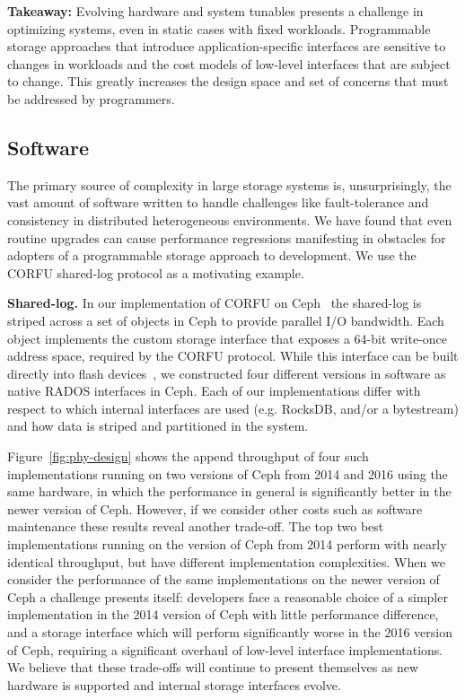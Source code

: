 \textbf{Takeaway:} Evolving hardware and system tunables presents a challenge
in optimizing systems, even in static cases with fixed workloads. Programmable
storage approaches that introduce application-specific interfaces are
sensitive to changes in workloads and the cost models of
low-level interfaces that are subject to change. This greatly increases the design
space and set of concerns that must be addressed by programmers.

\subsection{Software}
\label{software}

The primary source of complexity in large storage systems is, unsurprisingly,
the vast amount of software written to handle challenges like fault-tolerance
and consistency in distributed heterogeneous environments. We have found that
even routine upgrades can cause performance regressions manifesting in obstacles 
for adopters of a programmable storage approach to development. We use the
CORFU shared-log protocol as a motivating example.

{\bf Shared-log.} In our implementation of CORFU on Ceph~\cite{zlog} the shared-log is striped
across a set of objects in Ceph to provide parallel I/O bandwidth. Each object
implements the custom storage interface that exposes a 64-bit write-once address
space, required by the CORFU protocol.  While this interface can be
built directly into flash devices~\cite{wei:systor13}, we constructed four
different versions in software as native RADOS interfaces in Ceph. Each of our
implementations differ with respect to which internal interfaces are used
(e.g. RocksDB, and/or a bytestream) and how data is striped and partitioned in the system.

Figure~\ref{fig:phy-design} shows the append throughput of four such
implementations running on two versions of Ceph from 2014 and 2016 using the same hardware, in which
the performance in general is significantly better in the newer version of
Ceph. However, if we consider other costs such as software maintenance these results
reveal another trade-off. The top two best implementations running on
the version of Ceph from 2014 perform with nearly identical throughput, but
have different implementation complexities. When we consider the performance
of the same implementations on the newer version of Ceph a challenge presents
itself: developers face a reasonable choice of a simpler implementation in the
2014 version of Ceph with little performance difference, and a storage
interface which will perform significantly worse in the 2016 version of Ceph,
requiring a significant overhaul of low-level interface implementations. We
believe that these trade-offs will continue to present themselves as new
hardware is supported and internal storage interfaces evolve.

